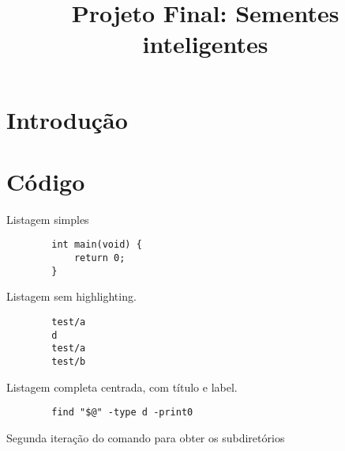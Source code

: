 \documentclass[code,math]{relatorio-deti}
\title{Projeto Final: Sementes inteligentes}
\begin{document}
\maketitle

\chapter{Introdução}

\lipsum[1-4]

\chapter{Código}

Listagem simples

\begin{listing}[H]
	\begin{verbatim}
		int main(void) {
			return 0;
		}
	\end{verbatim}
\end{listing}

Listagem sem highlighting.

\begin{listing}[H]
	\begin{verbatim}
		test/a
		d
		test/a
		test/b
	\end{verbatim}
\end{listing}

Listagem completa centrada, com título e label.

\begin{listing}[H]
	\centering
	\begin{verbatim}
        find "$@" -type d -print0
    \end{verbatim}
	\caption{Segunda iteração do comando para obter os subdiretórios}
	\label{code:implementation_second_subdir_find}
\end{listing}
\end{document}
